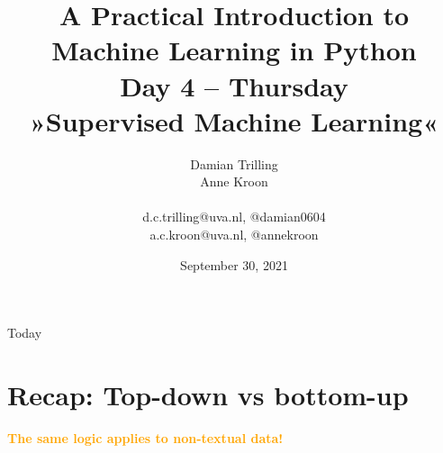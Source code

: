 \documentclass[compress]{beamer}
\title[ML in PYthon]{\textbf{A Practical Introduction to Machine Learning in Python} \\Day 4 -- Thursday \\ »Supervised Machine Learning«}
\author[Damian Trilling, Anne Kroon]{Damian Trilling \\ Anne Kroon \\ ~ \\ \footnotesize{d.c.trilling@uva.nl, @damian0604 \\a.c.kroon@uva.nl, @annekroon} \\}
\date{September 30, 2021}
\institute[Gesis]{Gesis}
\begin{document}
	
	\begin{frame}{}
		\titlepage
	\end{frame}
	
	\begin{frame}{Today}
		\tableofcontents
	\end{frame}
	
	

\section[Recap]{Recap: Top-down vs bottom-up}


\begin{frame}[plain]
\cite{Boumans2016}
\pause

\textbf{\textcolor{orange}{The same logic applies to non-textual data!}}
\end{frame}
\end{document}
